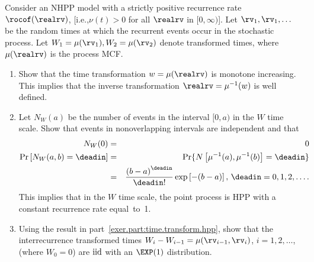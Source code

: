 \begin{exercise}
\label{exercise:nhpp.simulation}
Consider an NHPP model with a strictly positive recurrence rate
$\rocof(\realrv)$, [i.e.,$\nu(t)>0$ for all $\realrv$ in
$[0,\infty)$].  Let $\rv_{1},\rv_{1},\dots $ be the random times at
which the recurrent events occur in the stochastic process.  Let
$W_{1}=\mu(\rv_{1}),W_{2}=\mu(\rv_{2}) $ denote transformed times,
where $\mu(\realrv)$ is the process MCF.
\begin{enumerate}
\item
Show that the time transformation $w=\mu(\realrv)$ is
monotone increasing. This implies that 
the inverse transformation $\realrv=\mu^{-1}(w)$
is well defined.
\item
\label{exer.part:time.transform.hpp}
Let $N_{W}(a)$ be the number of events in the
interval $[0,a)$ in the $W$ time scale.
Show that events in nonoverlapping intervals 
are independent and that
\begin{eqnarray*}
N_{W}(0)&=&0
\\
\Pr \left [N_{W}(a,b)=\deadin \right ]&=&\Pr\{N \left
[ \mu^{-1}(a),\mu^{-1}(b) \right ]=\deadin\}
\\
&=&
\frac{\left ( b-a  \right )^{\deadin}}
                  {\deadin !}
	     \exp \left [ -(
 b-a)
		  \right ], \, \deadin=0,1,2, \dots .
\end{eqnarray*}
This implies that in the $W$ time scale, the point process
is HPP with a constant 
recurrence rate equal~to~1.
\item
Using the result in part~\ref{exer.part:time.transform.hpp},
show that the interrecurrence transformed times 
$W_{i}-W_{i-1}=\mu(\rv_{i-1}, \rv_{i})$, $i=1,2, \dots$, (where
 $W_{0}=0$) are $\rm iid$ with an $\EXP(1)$ distribution.
 

\end{enumerate}
\end{exercise}

